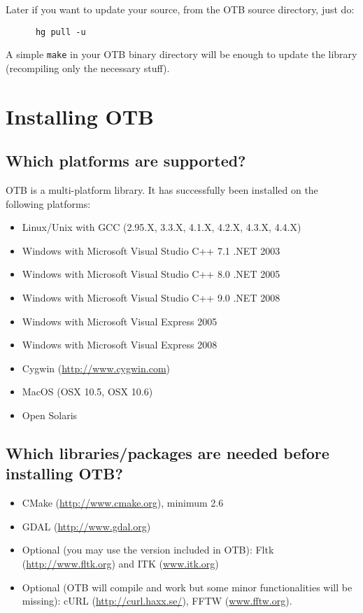 Later if you want to update your source, from the OTB source directory, just do:
\begin{verbatim}
      hg pull -u
\end{verbatim}

A simple \texttt{make} in your OTB binary directory will be enough to update the library (recompiling only the necessary stuff).


\section{Installing OTB}
\label{sec:FAQInstall}
\subsection{Which platforms are supported?}
OTB is a multi-platform library. It has successfully been installed on
the following platforms:
\begin{itemize}
  \item Linux/Unix with GCC (2.95.X, 3.3.X, 4.1.X, 4.2.X, 4.3.X, 4.4.X)
  \item Windows with Microsoft Visual Studio C++ 7.1 .NET 2003
  \item Windows with Microsoft Visual Studio C++ 8.0 .NET 2005
  \item Windows with Microsoft Visual Studio C++ 9.0 .NET 2008
  \item Windows with Microsoft Visual Express 2005
  \item Windows with Microsoft Visual Express 2008
  \item Cygwin (\url{http://www.cygwin.com})
  \item MacOS (OSX 10.5, OSX 10.6)
  \item Open Solaris
\end{itemize}

\subsection{Which libraries/packages are needed before installing
 OTB?}
\begin{itemize}
\item CMake (\url{http://www.cmake.org}), minimum 2.6
\item GDAL (\url{http://www.gdal.org})
\item Optional (you may use the version included in OTB): Fltk (\url{http://www.fltk.org}) and ITK (\url{www.itk.org})
\item Optional (OTB will compile and work but some minor functionalities will be missing): cURL (\url{http://curl.haxx.se/}), FFTW (\url{www.fftw.org}).
\end{itemize}

